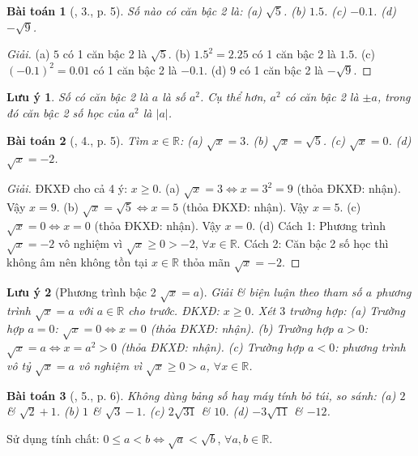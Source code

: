 \documentclass{article}
\newtheorem{baitoan}{Bài toán}
\newtheorem{luuy}{Lưu ý}
\begin{document}
\begin{baitoan}[\cite{SBT_Toan_9_tap_1}, 3., p. 5]
	Số nào có căn bậc 2 là: (a) $\sqrt{5}$. (b) $1.5$. (c) $-0.1$. (d) $-\sqrt{9}$.
\end{baitoan}

\begin{proof}[Giải]
	(a) $5$ có 1 căn bậc 2 là $\sqrt{5}$. (b) $1.5^2 = 2.25$ có 1 căn bậc 2 là $1.5$. (c) $(-0.1)^2 = 0.01$ có 1 căn bậc 2 là $-0.1$. (d) $9$ có 1 căn bậc 2 là $-\sqrt{9}$.
\end{proof}

\begin{luuy}
	Số có căn bậc 2 là $a$ là số $a^2$. Cụ thể hơn, $a^2$ có căn bậc 2 là $\pm a$, trong đó căn bậc 2 số học của $a^2$ là $|a|$.
\end{luuy}

\begin{baitoan}[\cite{SBT_Toan_9_tap_1}, 4., p. 5]
	Tìm $x\in\mathbb{R}$: (a) $\sqrt{x} = 3$. (b) $\sqrt{x} = \sqrt{5}$. (c) $\sqrt{x} = 0$. (d) $\sqrt{x} = -2$.
\end{baitoan}

\begin{proof}[Giải]
	ĐKXĐ cho cả 4 ý: $x\ge0$. (a) $\sqrt{x} = 3\Leftrightarrow x = 3^2 = 9$ (thỏa ĐKXĐ: nhận). Vậy $x = 9$. (b) $\sqrt{x} = \sqrt{5}\Leftrightarrow x = 5$ (thỏa ĐKXĐ: nhận). Vậy $x = 5$. (c) $\sqrt{x} = 0\Leftrightarrow x = 0$ (thỏa ĐKXĐ: nhận). Vậy $x = 0$. (d) {\sf Cách 1:} Phương trình $\sqrt{x} = -2$ vô nghiệm vì $\sqrt{x}\ge0 > -2$, $\forall x\in\mathbb{R}$. {\sf Cách 2:} Căn bậc 2 số học thì không âm nên không tồn tại $x\in\mathbb{R}$ thỏa mãn $\sqrt{x} = -2$.
\end{proof}

\begin{luuy}[Phương trình bậc 2 $\sqrt{x} = a$]
	Giải \& biện luận theo tham số $a$ phương trình $\sqrt{x} = a$ với $a\in\mathbb{R}$ cho trước. ĐKXĐ: $x\ge0$. Xét $3$ trường hợp: (a) Trường hợp $a = 0$: $\sqrt{x} = 0\Leftrightarrow x = 0$ (thỏa ĐKXĐ: nhận). (b) Trường hợp $a > 0$: $\sqrt{x} = a\Leftrightarrow x = a^2 > 0$ (thỏa ĐKXĐ: nhận). (c) Trường hợp $a < 0$: phương trình vô tỷ $\sqrt{x} = a$ vô nghiệm vì $\sqrt{x}\ge0 > a$, $\forall x\in\mathbb{R}$.
\end{luuy}

\begin{baitoan}[\cite{SBT_Toan_9_tap_1}, 5., p. 6]
	Không dùng bảng số hay máy tính bỏ túi, so sánh: (a) $2$ \& $\sqrt{2} + 1$. (b) $1$ \& $\sqrt{3} - 1$. (c) $2\sqrt{31}$ \& $10$. (d) $-3\sqrt{11}$ \& $-12$.
\end{baitoan}
 Sử dụng tính chất: $0\le a < b\Leftrightarrow\sqrt{a} < \sqrt{b}$, $\forall a,b\in\mathbb{R}$.
\end{document}
